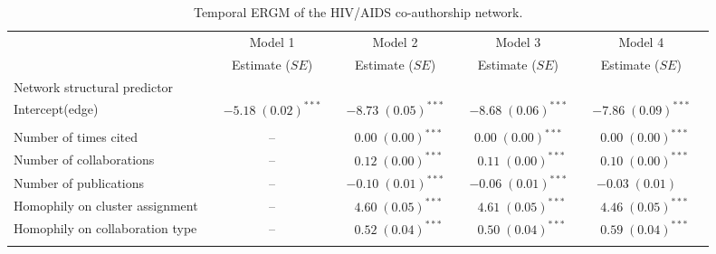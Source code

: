 \begin{table}
\begin{center}
\caption{Temporal ERGM of the HIV/AIDS co-authorship network.}
\label{tab:hiv_tergm}
\hspace*{-1cm}
\scriptsize
\begin{tabular}{@{}lcclclclcl@{}}
        \toprule
           &  & Model 1 &  & Model 2  &  & Model 3&  & Model 4\\ \cmidrule{3-3} \cmidrule{5-5} \cmidrule{7-7} \cmidrule{9-9}
           &  & Estimate ($SE$) &  & Estimate ($SE$)  &  & Estimate ($SE$) &  & Estimate ($SE$)\\
\midrule
Network structural predictor & & & & & & & & \\
\hspace{10pt}Intercept(edge)    &  & $-5.18 \; (0.02)^{***}$ &  & $-8.73 \; (0.05)^{***}$ &  & $-8.68 \; (0.06)^{***}$ &  & $-7.86 \; (0.09)^{***}$ \\\\
Number of times cited             &  &       --              &  & $\hspace{6pt}0.00 \; (0.00)^{***}$  &  & $0.00 \; (0.00)^{***}$  &  & $\hspace{6pt}0.00 \; (0.00)^{***}$  \\
Number of collaborations                 &  &         --            &  & $\hspace{6pt}0.12 \; (0.00)^{***}$  &  & $\hspace{6pt}0.11 \; (0.00)^{***}$  &  & $\hspace{6pt}0.10 \; (0.00)^{***}$  \\
Number of publications                 &  &            --         &  & $-0.10 \; (0.01)^{***}$ &  & $-0.06 \; (0.01)^{***}$ &  & $-0.03 \; (0.01)^{~~~~}$       \\
Homophily on cluster assignment            &  &        --             &  & $\hspace{6pt}4.60 \; (0.05)^{***}$  &  & $\hspace{6pt}4.61 \; (0.05)^{***}$  &  & $\hspace{6pt}4.46 \; (0.05)^{***}$  \\
Homophily on collaboration type           &  &          --           &  & $\hspace{6pt}0.52 \; (0.04)^{***}$  &  & $\hspace{6pt}0.50 \; (0.04)^{***}$  &  & $\hspace{6pt}0.59 \; (0.04)^{***}$  \\\\

\end{tabular}
\end{center}
\end{table}
